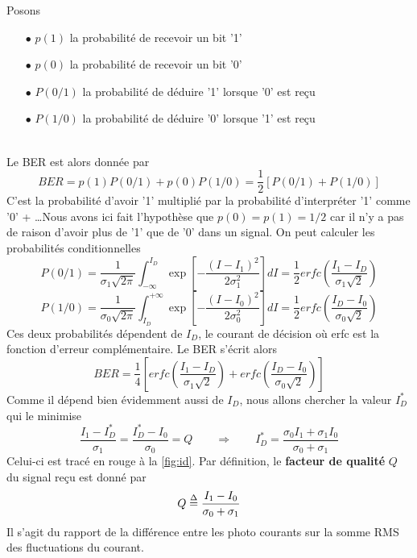 Posons
\begin{itemize}
\item[$\bullet$] $p(1)$ la probabilité de recevoir un bit '1'
\item[$\bullet$] $p(0)$ la probabilité de recevoir un bit '0'
\item[$\bullet$] $P(0/1)$ la probabilité de déduire '1' lorsque '0' est reçu
\item[$\bullet$] $P(1/0)$ la probabilité de déduire '0' lorsque '1' est reçu
\end{itemize}\ \\

Le BER est alors donnée par
\begin{equation}
BER = p\left( 1 \right)P\left( {0/1} \right) + p\left( 0 \right)P\left( {1/0} \right) = \frac{1}{2}\left[ {P\left( {0/1} \right) + P\left( {1/0} \right)} \right]
\end{equation}
C'est la probabilité d'avoir '1' multiplié par la probabilité d'interpréter '1' comme '0' + \dots Nous
avons ici fait l'hypothèse que $p(0)=p(1)=1/2$ car il n'y a pas de raison d'avoir plus de '1' que
de '0' dans un signal. On peut calculer les probabilités conditionnelles
\begin{equation}
P\left( {0/1} \right) = \frac{1}{{{\sigma _1}\sqrt {2\pi } }}\int_{ - \infty }^{{I_D}} {\exp \left[ { - \frac{{{{\left( {I - {I_1}} \right)}^2}}}{{2\sigma _1^2}}} \right]dI}  = \frac{1}{2}erfc\left( {\frac{{{I_1} - {I_D}}}{{{\sigma _1}\sqrt 2 }}} \right)
\end{equation}
\begin{equation}
P\left( {1/0} \right) = \frac{1}{{{\sigma _0}\sqrt {2\pi } }}\int_{{I_D}}^{ + \infty } {\exp \left[ { - \frac{{{{\left( {I - {I_0}} \right)}^2}}}{{2\sigma _0^2}}} \right]dI}  = \frac{1}{2}erfc\left( {\frac{{{I_D} - {I_0}}}{{{\sigma _0}\sqrt 2 }}} \right)
\end{equation}
Ces deux probabilités dépendent de $I_D$, le courant de décision où erfc est la fonction 
d'erreur complémentaire. Le BER s'écrit alors
\begin{equation}
BER = \frac{1}{4}\left[ {erfc\left( {\frac{{{I_1} - {I_D}}}{{{\sigma _1}\sqrt 2 }}} \right) + erfc\left( {\frac{{{I_D} - {I_0}}}{{{\sigma _0}\sqrt 2 }}} \right)} \right]
\end{equation}
Comme il dépend bien évidemment aussi de $I_D$, nous allons chercher la valeur $I_D^*$ qui 
le minimise
\begin{equation}
\frac{{{I_1} - I_D^*}}{{{\sigma _1}}} = \frac{{I_D^* - {I_0}}}{{{\sigma _0}}} = Q\qquad\Rightarrow
\qquad I_D^* = \frac{{{\sigma _0}{I_1} + {\sigma _1}{I_0}}}{{{\sigma _0} + {\sigma _1}}}
\end{equation}
Celui-ci est tracé en rouge à la \autoref{fig:id}. Par définition, le \textbf{facteur de qualité} 
$Q$ du signal reçu est donné par
\begin{equation}
Q \buildrel \Delta \over = \frac{{{I_1} - {I_0}}}{{{\sigma _0} + {\sigma _1}}}
\end{equation}
Il s'agit du rapport de la différence entre les photo courants sur la somme RMS des fluctuations
du courant. \\

